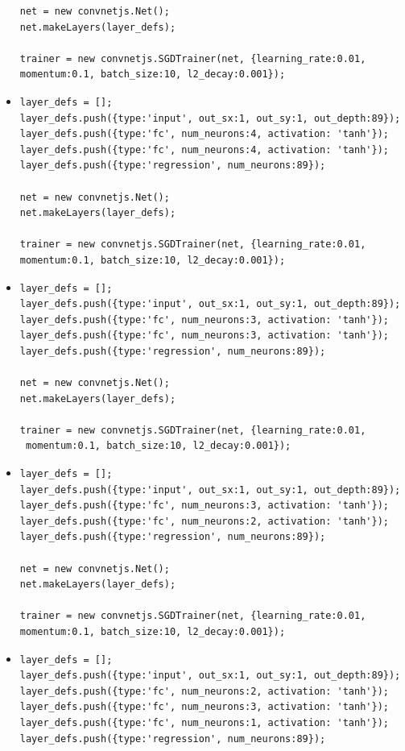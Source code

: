 \begin{itemize}
\begin{verbatim}
net = new convnetjs.Net();
net.makeLayers(layer_defs);

trainer = new convnetjs.SGDTrainer(net, {learning_rate:0.01, 
momentum:0.1, batch_size:10, l2_decay:0.001});
\end{verbatim}

\item \begin{verbatim}
layer_defs = [];
layer_defs.push({type:'input', out_sx:1, out_sy:1, out_depth:89});
layer_defs.push({type:'fc', num_neurons:4, activation: 'tanh'});
layer_defs.push({type:'fc', num_neurons:4, activation: 'tanh'});
layer_defs.push({type:'regression', num_neurons:89});

net = new convnetjs.Net();
net.makeLayers(layer_defs);

trainer = new convnetjs.SGDTrainer(net, {learning_rate:0.01, 
momentum:0.1, batch_size:10, l2_decay:0.001});
\end{verbatim}


\item \begin{verbatim}
layer_defs = [];
layer_defs.push({type:'input', out_sx:1, out_sy:1, out_depth:89});
layer_defs.push({type:'fc', num_neurons:3, activation: 'tanh'});
layer_defs.push({type:'fc', num_neurons:3, activation: 'tanh'});
layer_defs.push({type:'regression', num_neurons:89});

net = new convnetjs.Net();
net.makeLayers(layer_defs);

trainer = new convnetjs.SGDTrainer(net, {learning_rate:0.01,
 momentum:0.1, batch_size:10, l2_decay:0.001});
\end{verbatim}


\item \begin{verbatim}
layer_defs = [];
layer_defs.push({type:'input', out_sx:1, out_sy:1, out_depth:89});
layer_defs.push({type:'fc', num_neurons:3, activation: 'tanh'});
layer_defs.push({type:'fc', num_neurons:2, activation: 'tanh'});
layer_defs.push({type:'regression', num_neurons:89});

net = new convnetjs.Net();
net.makeLayers(layer_defs);

trainer = new convnetjs.SGDTrainer(net, {learning_rate:0.01, 
momentum:0.1, batch_size:10, l2_decay:0.001});
\end{verbatim}


\item \begin{verbatim}
layer_defs = [];
layer_defs.push({type:'input', out_sx:1, out_sy:1, out_depth:89});
layer_defs.push({type:'fc', num_neurons:2, activation: 'tanh'});
layer_defs.push({type:'fc', num_neurons:3, activation: 'tanh'});
layer_defs.push({type:'fc', num_neurons:1, activation: 'tanh'});
layer_defs.push({type:'regression', num_neurons:89});


\end{verbatim}
\end{itemize}
